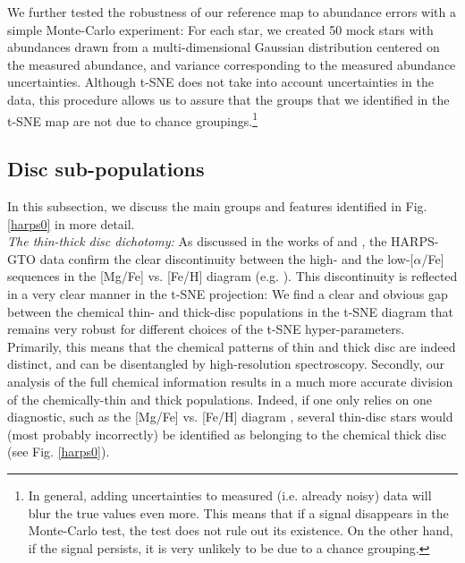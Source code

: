 \documentclass{aa}  %
\begin{document}
We further tested the robustness of our reference map to abundance errors with a simple Monte-Carlo experiment: For each star, we created 50 mock stars with abundances drawn from a multi-dimensional Gaussian distribution centered on the measured abundance, and variance corresponding to the measured abundance uncertainties. Although t-SNE does not take into account uncertainties in the data, this procedure allows us to assure that the groups that we identified in the t-SNE map are not due to chance groupings.\footnote{In general, adding uncertainties to measured (i.e. already noisy) data will blur the true values even more. This means that if a signal disappears in the Monte-Carlo test, the test does not rule out its existence. On the other hand, if the signal persists, it is very unlikely to be due to a chance grouping.} 

\subsection{Disc sub-populations}

In this subsection, we discuss the main groups and features identified in Fig. \ref{harps0} in more detail.\\

{\it The thin-thick disc dichotomy:} As discussed in the works of \citet{Adibekyan2011, Adibekyan2012} and \citet{DelgadoMena2017}, the HARPS-GTO data confirm the clear discontinuity between the high- and the low-[$\alpha$/Fe] sequences in the [Mg/Fe] vs. [Fe/H] diagram (e.g. \citealt{Edvardsson1993, Fuhrmann1998, Fuhrmann2011, Fuhrmann2017}). This discontinuity is reflected in a very clear manner in the t-SNE projection:
We find a clear and obvious gap between the chemical thin- and thick-disc populations in the t-SNE diagram that remains very robust for different choices of the t-SNE hyper-parameters. Primarily, this means that the chemical patterns of thin and thick disc are indeed distinct, and can be disentangled by high-resolution spectroscopy. Secondly, our analysis of the full chemical information results in a much more accurate division of the chemically-thin and thick populations. Indeed, if one only relies on one diagnostic, such as the [Mg/Fe] vs. [Fe/H] diagram \citep{Adibekyan2011, DelgadoMena2017}, several thin-disc stars would (most probably incorrectly) be identified as belonging to the chemical thick disc (see Fig. \ref{harps0}).
\end{document}
